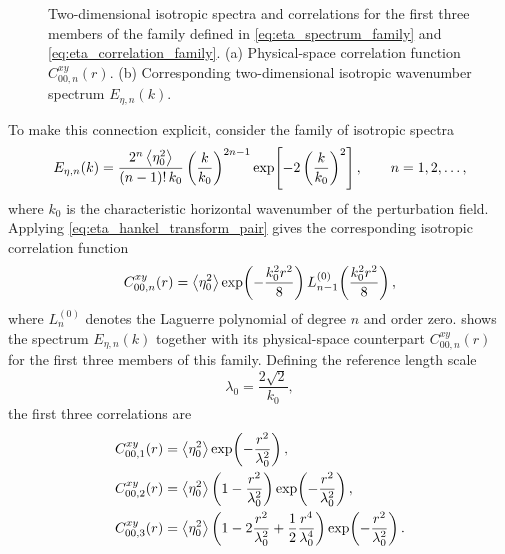 \begin{figure}
    \centering
    \begin{minipage}{0.48\textwidth}
        \centering
        
    \end{minipage}
    \hfill
    \begin{minipage}{0.48\textwidth}
        \centering
        
    \end{minipage}
    \caption{Two-dimensional isotropic spectra and correlations for the first three members of the family defined in \eqref{eq:eta_spectrum_family} and
    \eqref{eq:eta_correlation_family}. (a) Physical-space correlation function
    \(C_{00,n}^{xy}(r)\).
    (b) Corresponding two-dimensional isotropic wavenumber spectrum \(E_{\eta,n}(k)\).}
    \label{fig:eta_2d_family}
\end{figure}
To make this connection explicit, consider the family of isotropic spectra
\begin{equation}
    E_{\eta,n}(k)
    =
    \frac{2^n\left\langle \eta_0^2 \right\rangle}{(n-1)!\,k_0}
    \left(\frac{k}{k_0}\right)^{2n-1}
    \exp\!\left[
        -2\left(\frac{k}{k_0}\right)^2
    \right],
    \qquad
    n=1,2,\ldots,
    \label{eq:eta_spectrum_family}
\end{equation}
where \(k_0\) is the characteristic horizontal wavenumber of the perturbation field. Applying \eqref{eq:eta_hankel_transform_pair} gives the corresponding isotropic correlation function
\begin{equation}
    C_{00,n}^{xy}(r)
    =
    \left\langle \eta_0^2 \right\rangle
    \exp\!\left(-\frac{k_0^2 r^2}{8}\right)
    L_{n-1}^{(0)}
    \!\left(
        \frac{k_0^2 r^2}{8}
    \right),
    \label{eq:eta_correlation_family}
\end{equation}
where \(L_n^{(0)}\) denotes the Laguerre polynomial of degree \(n\) and order zero.  shows the spectrum \(E_{\eta,n}(k)\) together with its physical-space counterpart \(C_{00,n}^{xy}(r)\) for the first three members of this family. Defining the reference length scale
\begin{equation}
    \lambda_0
    =
    \frac{2\sqrt{2}}{k_0},
    \label{eq:lambda0_k0_relation}
\end{equation}
the first three correlations are
\begin{equation}
\begin{aligned}
    C_{00,1}^{xy}(r)
    &=
    \left\langle \eta_0^2 \right\rangle
    \exp\!\left(-\frac{r^2}{\lambda_0^2}\right),
    \\
    C_{00,2}^{xy}(r)
    &=
    \left\langle \eta_0^2 \right\rangle
    \left(
        1-\frac{r^2}{\lambda_0^2}
    \right)
    \exp\!\left(-\frac{r^2}{\lambda_0^2}\right),
    \\
    C_{00,3}^{xy}(r)
    &=
    \left\langle \eta_0^2 \right\rangle
    \left(
        1
        -
        2\frac{r^2}{\lambda_0^2}
        +
        \frac{1}{2}\frac{r^4}{\lambda_0^4}
    \right)
    \exp\!\left(-\frac{r^2}{\lambda_0^2}\right).
\end{aligned}
\label{eq:eta_correlation_family_examples}
\end{equation}
